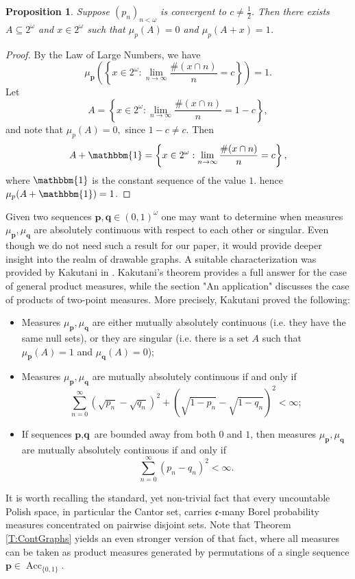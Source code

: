 \documentclass{amsart}
\newtheorem{prop}[theorem]{Proposition}
\theoremstyle{plain}
\theoremstyle{definition}
\theoremstyle{remark}
\numberwithin{equation}{section}
\DeclareMathOperator{\Acc}{Acc}
\begin{document}
\begin{prop}
    Suppose $(p_n)_{n<\omega}$ is convergent to $c \neq \frac12$. Then there exists $A\subseteq 2^\omega$ and $x\in2^\omega$ such that $\mu_p(A)=0$ and $\mu_p(A+x)= 1$.
\end{prop}
\begin{proof}
    By the Law of Large Numbers, we have 
    \[
    \mu_{\textbf{p}}\left(\left\{ x\in 2^\omega: \lim_{n\to\infty} \frac{\#(x\cap n)}{n}=c \right\}\right)=1.
    \]
    Let 
    \[
    A=\left\{x\in 2^\omega\colon \lim_{n\to\infty}\frac{ \#\left(x\cap n\right)}{n }= 1-c \right\},
    \]
    and note that $\mu_p \left(A\right)=0,$ 
    since $1-c\neq c$. Then
    \[
    A+\mathbbm{1} =\left\{ x\in 2^\omega: \lim_{n\to\infty} \frac{\#(x\cap n)}{n}=c \right\},
    \]
    where $\mathbbm{1}$ is the constant sequence of the value $1$. hence $\mu_p (A+\mathbbm{1})=1$.
\end{proof}
Given two sequences $\textbf{p}, \textbf{q}\in(0,1)^\omega$ one may want to determine when measures $\mu_\textbf{p}, \mu_\textbf{q}$ are absolutely continuous with respect to each other or singular. Even though we do not need such a result for our paper, it would provide deeper insight into the realm of drawable graphs. A suitable characterization was provided by Kakutani in \cite{Kakutani_Product}. Kakutani’s theorem provides a full answer for the case of general product measures, while the section "An application" discusses the case of products of two-point measures. More precisely, Kakutani proved the following: 
\begin{itemize}
    \item Measures $\mu_\textbf{p}, \mu_\textbf{q}$ are either mutually absolutely continuous (i.e. they have the same null sets), or they are singular (i.e. there is a set $A$ such that $\mu_\textbf{p}(A)=1$ and $\mu_\textbf{q}(A)=0$);
    \item Measures $\mu_\textbf{p}, \mu_\textbf{q}$ are mutually absolutely continuous if and only if 
    \[
    \sum\limits_{n=0}^\infty \left(\sqrt{p_n}-\sqrt{q_n}\right)^2+\left(\sqrt{1-p_n}-\sqrt{1-q_n}\right)^2<\infty;
    \]
    \item If sequences $\textbf{p},\textbf{q}$ are bounded away from both $0$ and $1$, then measures $\mu_\textbf{p}, \mu_\textbf{q}$ are mutually absolutely continuous if and only if 
    \[
    \sum\limits_{n=0}^\infty \left( p_n-q_n\right)^2<\infty.
    \]
\end{itemize}

It is worth recalling the standard, yet non-trivial fact that every uncountable Polish space, in particular the Cantor set, carries $\mathfrak{c}$-many Borel probability measures concentrated on pairwise disjoint sets. Note that Theorem \ref{T:ContGraphs} yields an even stronger version of that fact, where all measures can be taken as product measures generated by permutations of a single sequence $\textbf{p}\in\Acc_{\{0,1\}}$. 
\end{document}
